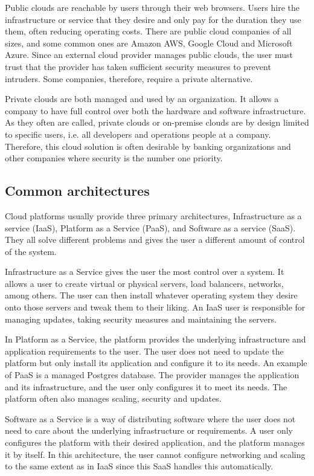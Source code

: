Public clouds are reachable by users through their web browsers. Users hire the infrastructure or service that they desire and only pay for the duration they use them, often reducing operating costs. There are public cloud companies of all sizes, and some common ones are Amazon AWS, Google Cloud and Microsoft Azure. Since an external cloud provider manages public clouds, the user must trust that the provider has taken sufficient security measures to prevent intruders. Some companies, therefore, require a private alternative. 

Private clouds are both managed and used by an organization. It allows a company to have full control over both the hardware and software infrastructure. As they often are called, private clouds or on-premise clouds are by design limited to specific users, i.e. all developers and operations people at a company. Therefore, this cloud solution is often desirable by banking organizations and other companies where security is the number one priority.

\subsection{Common architectures}
Cloud platforms usually provide three primary architectures, Infrastructure as a service (IaaS), Platform as a Service (PaaS), and Software as a service (SaaS)\cite{architectures}. They all solve different problems and gives the user a different amount of control of the system. 

Infrastructure as a Service gives the user the most control over a system. It allows a user to create virtual or physical servers, load balancers, networks, among others. The user can then install whatever operating system they desire onto those servers and tweak them to their liking. An IaaS user is responsible for managing updates, taking security measures and maintaining the servers. 

In Platform as a Service, the platform provides the underlying infrastructure and application requirements to the user. The user does not need to update the platform but only install its application and configure it to its needs. An example of PaaS is a managed Postgres database. The provider manages the application and its infrastructure, and the user only configures it to meet its needs. The platform often also manages scaling, security and updates. 

Software as a Service is a way of distributing software where the user does not need to care about the underlying infrastructure or requirements. A user only configures the platform with their desired application, and the platform manages it by itself. In this architecture, the user cannot configure networking and scaling to the same extent as in IaaS since this SaaS handles this automatically. 

